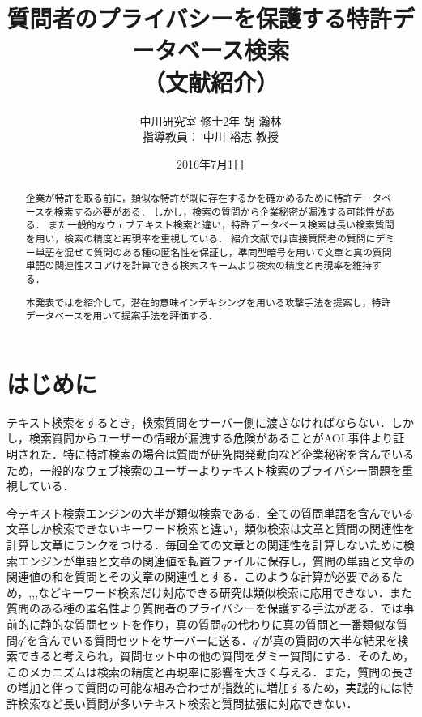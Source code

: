 \documentclass{jsarticle}
\title{質問者のプライバシーを保護する特許データベース検索 \\（文献紹介）}
\author{中川研究室 修士2年 胡 瀚林\\指導教員： 中川 裕志 教授}
\date{2016年7月1日}
\theoremstyle{definition}
\begin{document}
\maketitle
\begin{abstract}
企業が特許を取る前に，類似な特許が既に存在するかを確かめるために特許データベースを検索する必要がある．
しかし，検索の質問から企業秘密が漏洩する可能性がある．
また一般的なウェブテキスト検索と違い，特許データベース検索は長い検索質問を用い，検索の精度と再現率を重視している．
紹介文献\cite{pang_embellishing_2010}では直接質問者の質問にデミー単語を混ぜて質問のある種の匿名性を保証し，準同型暗号を用いて文章と真の質問単語の関連性スコアけを計算できる検索スキームより検索の精度と再現率を維持する．

本発表では\cite{pang_embellishing_2010}を紹介して，潜在的意味インデキシングを用いる攻撃手法を提案し，特許データベースを用いて提案手法を評価する．
\end{abstract}

\section{はじめに}
テキスト検索をするとき，検索質問をサーバー側に渡さなければならない．しかし，検索質問からユーザーの情報が漏洩する危険があることがAOL事件\cite{_face_2006}より証明された．特に特許検索の場合は質問が研究開発動向など企業秘密を含んでいるため，一般的なウェブ検索のユーザーよりテキスト検索のプライバシー問題を重視している．

今テキスト検索エンジンの大半が類似検索である．全ての質問単語を含んでいる文章しか検索できないキーワード検索と違い，類似検索は文章と質問の関連性を計算し文章にランクをつける\cite{zobel_inverted_2006}．毎回全ての文章との関連性を計算しないために検索エンジンが単語と文章の関連値を転置ファイルに保存し，質問の単語と文章の関連値の和を質問とその文章の関連性とする．このような計算が必要であるため，\cite{bethencourt_new_2006},\cite{freedman_keyword_2005},\cite{boneh_public_2004},\cite{song_practical_2000}などキーワード検索だけ対応できる研究は類似検索に応用できない．また質問のある種の匿名性より質問者のプライバシーを保護する手法がある．\cite{murugesan_providing_2009}では事前的に静的な質問セットを作り，真の質問$q$の代わりに真の質問と一番類似な質問$q'$を含んでいる質問セットをサーバーに送る．$q'$が真の質問の大半な結果を検索できると考えられ，質問セット中の他の質問をダミー質問にする．そのため，このメカニズムは検索の精度と再現率に影響を大きく与える．また，質問の長さの増加と伴って質問の可能な組み合わせが指数的に増加するため，実践的には特許検索など長い質問が多いテキスト検索と質問拡張\cite{qiu_concept_1993,xu_query_1996}に対応できない．
\end{document}
